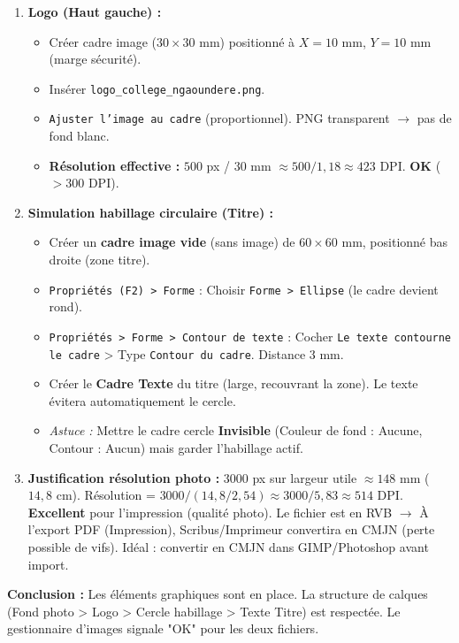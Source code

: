 \documentclass[11pt]{article}
\begin{document}
\begin{exoresolu}
\begin{enumerate}
\begin{itemize}
                  \item \textbf{Ordre des calques :} \texttt{Clic droit > Niveau > Envoyer au fond} (icône page avec flèche bas). Ainsi le texte passera au-dessus.
              \end{itemize}
        \item \textbf{Logo (Haut gauche) :}
              \begin{itemize}
                  \item Créer cadre image ($30 \times 30$ mm) positionné à $X=10$ mm, $Y=10$ mm (marge sécurité).
                  \item Insérer \texttt{logo\_college\_ngaoundere.png}.
                  \item \texttt{Ajuster l'image au cadre} (proportionnel). PNG transparent $\rightarrow$ pas de fond blanc.
                  \item \textbf{Résolution effective :} $500$ px / $30$ mm $\approx 500 / 1,18 \approx 423$ DPI. \textbf{OK} ($> 300$ DPI).
              \end{itemize}
        \item \textbf{Simulation habillage circulaire (Titre) :}
              \begin{itemize}
                  \item Créer un \textbf{cadre image vide} (sans image) de $60 \times 60$ mm, positionné bas droite (zone titre).
                  \item \texttt{Propriétés (F2) > Forme} : Choisir \texttt{Forme > Ellipse} (le cadre devient rond).
                  \item \texttt{Propriétés > Forme > Contour de texte} : Cocher \texttt{Le texte contourne le cadre} > Type \texttt{Contour du cadre}. Distance $3$ mm.
                  \item Créer le \textbf{Cadre Texte} du titre (large, recouvrant la zone). Le texte évitera automatiquement le cercle.
                  \item \emph{Astuce :} Mettre le cadre cercle \textbf{Invisible} (Couleur de fond : Aucune, Contour : Aucun) mais garder l'habillage actif.
              \end{itemize}
        \item \textbf{Justification résolution photo :} $3000$ px sur largeur utile $\approx 148$ mm ($14,8$ cm). Résolution = $3000 / (14,8 / 2,54) \approx 3000 / 5,83 \approx 514$ DPI. \textbf{Excellent} pour l'impression (qualité photo). Le fichier est en RVB $\rightarrow$ À l'export PDF (Impression), Scribus/Imprimeur convertira en CMJN (perte possible de vifs). Idéal : convertir en CMJN dans GIMP/Photoshop avant import.
    \end{enumerate}
    \textbf{Conclusion :} Les éléments graphiques sont en place. La structure de calques (Fond photo > Logo > Cercle habillage > Texte Titre) est respectée. Le gestionnaire d'images signale "OK" pour les deux fichiers.
\end{exoresolu}
\end{document}
